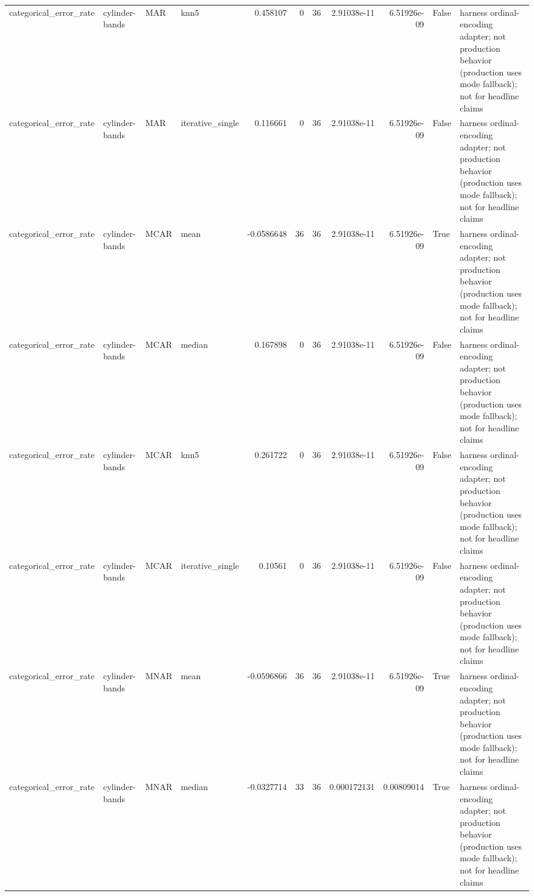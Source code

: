 \begin{table}[ht]
\begin{tabular}{llllrrrrrll}
 categorical\_error\_rate & cylinder-bands       & MAR         & knn5             &      0.458107    &                   0 &      36 & 2.91038e-11 & 6.51926e-09 & False              & harness ordinal-encoding adapter; not production behavior (production uses mode fallback); not for headline claims \\
 categorical\_error\_rate & cylinder-bands       & MAR         & iterative\_single &      0.116661    &                   0 &      36 & 2.91038e-11 & 6.51926e-09 & False              & harness ordinal-encoding adapter; not production behavior (production uses mode fallback); not for headline claims \\
 categorical\_error\_rate & cylinder-bands       & MCAR        & mean             &     -0.0586648   &                  36 &      36 & 2.91038e-11 & 6.51926e-09 & True               & harness ordinal-encoding adapter; not production behavior (production uses mode fallback); not for headline claims \\
 categorical\_error\_rate & cylinder-bands       & MCAR        & median           &      0.167898    &                   0 &      36 & 2.91038e-11 & 6.51926e-09 & False              & harness ordinal-encoding adapter; not production behavior (production uses mode fallback); not for headline claims \\
 categorical\_error\_rate & cylinder-bands       & MCAR        & knn5             &      0.261722    &                   0 &      36 & 2.91038e-11 & 6.51926e-09 & False              & harness ordinal-encoding adapter; not production behavior (production uses mode fallback); not for headline claims \\
 categorical\_error\_rate & cylinder-bands       & MCAR        & iterative\_single &      0.10561     &                   0 &      36 & 2.91038e-11 & 6.51926e-09 & False              & harness ordinal-encoding adapter; not production behavior (production uses mode fallback); not for headline claims \\
 categorical\_error\_rate & cylinder-bands       & MNAR        & mean             &     -0.0596866   &                  36 &      36 & 2.91038e-11 & 6.51926e-09 & True               & harness ordinal-encoding adapter; not production behavior (production uses mode fallback); not for headline claims \\
 categorical\_error\_rate & cylinder-bands       & MNAR        & median           &     -0.0327714   &                  33 &      36 & 0.000172131 & 0.00809014  & True               & harness ordinal-encoding adapter; not production behavior (production uses mode fallback); not for headline claims \\

\end{tabular}
\end{table}
